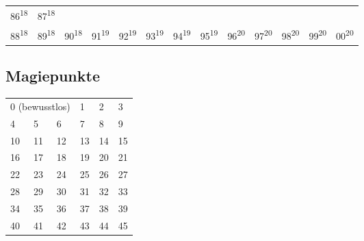 \documentclass[a4paper,twoside]{article}
\begin{document}
\begin{Row}
\begin{Cell}{2}
\begin{tabular}{ | m{2.5mm} m{2.5mm} m{2.5mm} m{2.5mm} m{2.5mm} m{2.5mm} m{2.5mm} m{2.5mm} m{2.5mm} m{2.5mm} m{2.5mm} m{2.5mm} m{4mm} | }
            \footnotesize{86\textsuperscript{18}} &
            \footnotesize{87\textsuperscript{18}} \\
            \footnotesize{88\textsuperscript{18}} &
            \footnotesize{89\textsuperscript{18}} &
            \footnotesize{90\textsuperscript{18}} &
            \footnotesize{91\textsuperscript{19}} &
            \footnotesize{92\textsuperscript{19}} &
            \footnotesize{93\textsuperscript{19}} &
            \footnotesize{94\textsuperscript{19}} &
            \footnotesize{95\textsuperscript{19}} &
            \footnotesize{96\textsuperscript{20}} &
            \footnotesize{97\textsuperscript{20}} &
            \footnotesize{98\textsuperscript{20}} &
            \footnotesize{99\textsuperscript{20}} &
            \footnotesize{00\textsuperscript{20}} \\
            \hline
        \end{tabular}
    \end{Cell}
    \begin{Cell}{1}
        \subsection*{Magiepunkte}
        \begin{tabular}{ | m{2.5mm} m{2.5mm} m{2.5mm} m{2.5mm} m{2.5mm} m{2.5mm} | }
            \hline
            \multicolumn{3}{|l}{\small{0 \tiny{(bewusstlos)}}} &
            \small{1} &
            \small{2} &
            \small{3} \\
            \small{4} &
            \small{5} &
            \small{6} &
            \small{7} &
            \small{8} &
            \small{9} \\
            \small{10} &
            \small{11} &
            \small{12} &
            \small{13} &
            \small{14} &
            \small{15} \\
            \small{16} &
            \small{17} &
            \small{18} &
            \small{19} &
            \small{20} &
            \small{21} \\
            \small{22} &
            \small{23} &
            \small{24} &
            \small{25} &
            \small{26} &
            \small{27} \\
            \small{28} &
            \small{29} &
            \small{30} &
            \small{31} &
            \small{32} &
            \small{33} \\
            \small{34} &
            \small{35} &
            \small{36} &
            \small{37} &
            \small{38} &
            \small{39} \\
            \small{40} &
            \small{41} &
            \small{42} &
            \small{43} &
            \small{44} &
            \small{45} \\
            \hline
        \end{tabular}
    \end{Cell}
    \begin{Cell}{1}

\end{Cell}
\end{Row}
\end{document}
